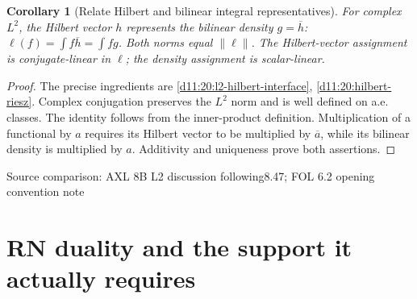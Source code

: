 \documentclass[11pt,oneside,openany]{book}
\newtheorem{corollary}[theorem]{Corollary}
\theoremstyle{definition}
\theoremstyle{remark}
\newcommand{\family}[1]{}
\newcommand{\source}[1]{\par\begingroup\small\sffamily\color{black!65}Source comparison: #1\par\endgroup}
\begin{document}
\begin{corollary}[Relate Hilbert and bilinear integral representatives]\family{D11.20.hilbert_bilinear_bridge}\label{d11:20:hilbert-bilinear-bridge}
For complex $L^2$, the Hilbert vector $h$ represents the bilinear density $g=\overline h$: $\ell(f)=\int f\overline h=\int fg$. Both norms equal $\|\ell\|$. The Hilbert-vector assignment is conjugate-linear in $\ell$; the density assignment is scalar-linear.
\end{corollary}
\begin{proof}
The precise ingredients are \cref{d11:20:l2-hilbert-interface}, \cref{d11:20:hilbert-riesz}. Complex conjugation preserves the $L^2$ norm and is well defined on a.e. classes. The identity follows from the inner-product definition. Multiplication of a functional by $a$ requires its Hilbert vector to be multiplied by $\overline a$, while its bilinear density is multiplied by $a$. Additivity and uniqueness prove both assertions.
\end{proof}
\source{AXL 8B L2 discussion following8.47; FOL 6.2 opening convention note}

\section{RN duality and the support it actually requires}
\end{document}
